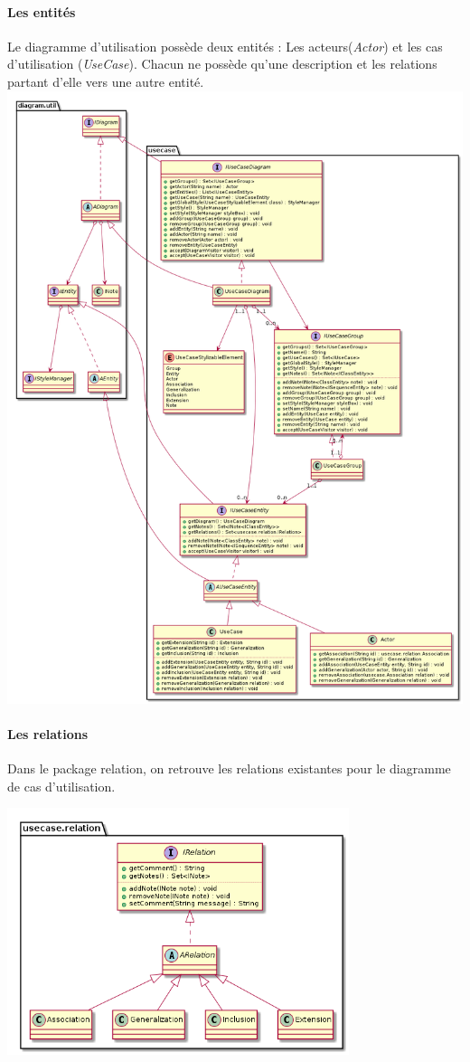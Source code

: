 \documentclass[a4paper,10pt]{article}
\begin{document}
	\paragraph{Les entités}
	\begin{center}
	  Le diagramme d'utilisation possède deux entités : Les acteurs(\emph{Actor}) et les cas d'utilisation (\emph{UseCase}).
	  Chacun ne possède qu'une description et les relations partant d'elle vers une autre entité.
	  \includegraphics[width=16cm]{Image/usecase.png}
	\end{center}
	\paragraph{Les relations}
	Dans le package relation, on retrouve les relations existantes pour le diagramme de cas d'utilisation. 
	\begin{center}
	  \includegraphics[width=10cm]{Image/useCaseRelation.png}
	\end{center}
\end{document}

